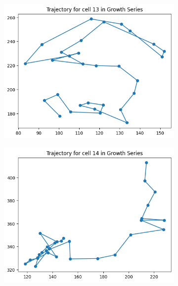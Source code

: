\documentclass{article}
\begin{document}
\clearpage

\begin{figure}[h!]
    \centering
    \begin{subfigure}[b]{0.5\linewidth}
        \centering
        \includegraphics[width=\linewidth]{Report/Appendix_Images/Trajectory-B-Growth/trajectory_13.png}
    \end{subfigure}%
    \begin{subfigure}[b]{0.5\linewidth}
        \centering
        \includegraphics[width=\linewidth]{Report/Appendix_Images/Trajectory-B-Growth/trajectory_14.png}
    \end{subfigure}

\end{figure}
\end{document}
